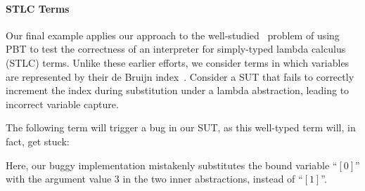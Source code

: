\paragraph{STLC Terms}
Our final example applies our approach to the
well-studied~\cite{BeginnerLuck,CoverageType,FQL24} problem of using
PBT to test the correctness of an interpreter for simply-typed lambda
calculus (STLC) terms.    Unlike
these earlier efforts, we consider terms in which variables are
represented by their de Bruijn index~\cite{DeBruijn}. Consider a SUT
that fails to correctly increment the index during substitution under
a lambda abstraction, leading to incorrect variable capture. %
\vspace{-.4cm} \par{}\vspace{-.5cm} \par\nobreak\noindent
The following term will trigger a bug in our SUT, as this well-typed
term will, in fact, get stuck: %
\vspace{-.4cm} \par{}\vspace{-.5cm} \par\nobreak\noindent %
Here, our buggy implementation mistakenly substitutes the bound
variable ``$[0]$'' with the argument value $3$ in the two inner
abstractions, instead of ``$[1]$''.

